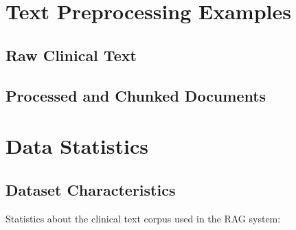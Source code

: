 \section{Text Preprocessing Examples}

\subsection{Raw Clinical Text}

\subsection{Processed and Chunked Documents}

\section{Data Statistics}

\subsection{Dataset Characteristics}
Statistics about the clinical text corpus used in the RAG system:

\blindtext
